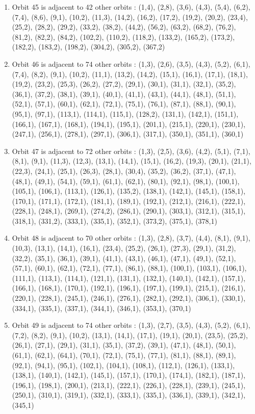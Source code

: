 \documentclass[12pt]{article}
\begin{document}
\begin{enumerate}
\item Orbit 45 is adjacent to 42 other orbits : (1,4), (2,8), (3,6), (4,3), (5,4), (6,2), (7,4), (8,6), (9,1), (10,2), (11,3), (14,2), (16,2), (17,2), (19,2), (20,2), (23,4), (25,2), (28,2), (29,2), (33,2), (38,2), (44,2), (56,2), (63,2), (68,2), (76,2), (81,2), (82,2), (84,2), (102,2), (110,2), (118,2), (133,2), (165,2), (173,2), (182,2), (183,2), (198,2), (304,2), (305,2), (367,2)
\item Orbit 46 is adjacent to 74 other orbits : (1,3), (2,6), (3,5), (4,3), (5,2), (6,1), (7,4), (8,2), (9,1), (10,2), (11,1), (13,2), (14,2), (15,1), (16,1), (17,1), (18,1), (19,2), (23,2), (25,3), (26,2), (27,2), (29,1), (30,1), (31,1), (32,1), (35,2), (36,1), (37,2), (38,1), (39,1), (40,1), (41,1), (43,1), (44,1), (48,1), (51,1), (52,1), (57,1), (60,1), (62,1), (72,1), (75,1), (76,1), (87,1), (88,1), (90,1), (95,1), (97,1), (113,1), (114,1), (115,1), (128,2), (131,1), (142,1), (151,1), (166,1), (167,1), (168,1), (194,1), (195,1), (201,1), (215,1), (220,1), (230,1), (247,1), (256,1), (278,1), (297,1), (306,1), (317,1), (350,1), (351,1), (360,1)
\item Orbit 47 is adjacent to 72 other orbits : (1,3), (2,5), (3,6), (4,2), (5,1), (7,1), (8,1), (9,1), (11,3), (12,3), (13,1), (14,1), (15,1), (16,2), (19,3), (20,1), (21,1), (22,3), (24,1), (25,1), (26,3), (28,1), (30,4), (35,2), (36,2), (37,1), (47,1), (48,1), (49,1), (54,1), (59,1), (61,1), (62,1), (80,1), (92,1), (98,1), (100,1), (105,1), (106,1), (113,1), (126,1), (135,2), (138,1), (142,1), (145,1), (158,1), (170,1), (171,1), (172,1), (181,1), (189,1), (192,1), (212,1), (216,1), (222,1), (228,1), (248,1), (269,1), (274,2), (286,1), (290,1), (303,1), (312,1), (315,1), (318,1), (331,2), (333,1), (335,1), (352,1), (373,2), (375,1), (378,1)
\item Orbit 48 is adjacent to 70 other orbits : (1,3), (2,8), (3,7), (4,4), (8,1), (9,1), (10,3), (13,1), (14,1), (16,1), (23,4), (25,2), (26,1), (27,3), (29,1), (31,2), (32,2), (35,1), (36,1), (39,1), (41,1), (43,1), (46,1), (47,1), (49,1), (52,1), (57,1), (60,1), (62,1), (72,1), (77,1), (86,1), (88,1), (100,1), (103,1), (106,1), (111,1), (113,1), (114,1), (121,1), (131,1), (132,1), (140,1), (142,1), (157,1), (166,1), (168,1), (170,1), (192,1), (196,1), (197,1), (199,1), (215,1), (216,1), (220,1), (228,1), (245,1), (246,1), (276,1), (282,1), (292,1), (306,1), (330,1), (334,1), (335,1), (337,1), (344,1), (346,1), (353,1), (370,1)
\item Orbit 49 is adjacent to 74 other orbits : (1,3), (2,7), (3,5), (4,3), (5,2), (6,1), (7,2), (8,2), (9,1), (10,2), (13,1), (14,1), (17,1), (19,1), (20,1), (23,5), (25,2), (26,1), (27,1), (29,1), (31,1), (35,1), (37,2), (39,1), (47,1), (48,1), (50,1), (61,1), (62,1), (64,1), (70,1), (72,1), (75,1), (77,1), (81,1), (88,1), (89,1), (92,1), (94,1), (95,1), (102,1), (104,1), (108,1), (112,1), (126,1), (133,1), (138,1), (140,1), (142,1), (145,1), (157,1), (170,1), (174,1), (182,1), (187,1), (196,1), (198,1), (200,1), (213,1), (222,1), (226,1), (228,1), (239,1), (245,1), (250,1), (310,1), (319,1), (332,1), (333,1), (335,1), (336,1), (339,1), (342,1), (345,1)

\end{enumerate}
\end{document}
